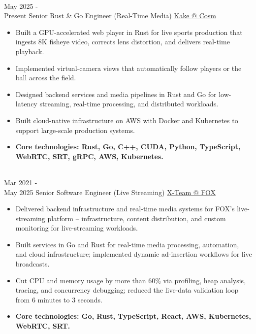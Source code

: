 \documentclass[letterpaper]{twentysecondcv} %
\begin{document}
\begin{twenty} %

\twentyitem
    {\\
    May 2025 - \\ Present}
    {Senior Rust \& Go Engineer (Real-Time Media)}
    {\href{https://kake.co/}{Kake @ Cosm}}
    {}
    {
    \begin{itemize}
    \item Built a GPU-accelerated web player in Rust for live sports production that ingests 8K fisheye video, corrects lens distortion, and delivers real-time playback.
    \item Implemented virtual-camera views that automatically follow players or the ball across the field.
    \item Designed backend services and media pipelines in Rust and Go for low-latency streaming, real-time processing, and distributed workloads.
    \item Built cloud-native infrastructure on AWS with Docker and Kubernetes to support large-scale production systems.
    \item \textbf{Core technologies: Rust, Go, C++, CUDA, Python, TypeScript, WebRTC, SRT, gRPC, AWS, Kubernetes.}
    \end{itemize}
    }

\twentyitem
    {\\
    Mar 2021 - \\ May 2025}
    {Senior Software Engineer (Live Streaming)}
    {\href{https://x-team.com/}{X-Team @ FOX}}
    {}
    {
    \begin{itemize}
    \item Delivered backend infrastructure and real-time media systems for FOX's live-streaming platform -- infrastructure, content distribution, and custom monitoring for live-streaming workloads.
    \item Built services in Go and Rust for real-time media processing, automation, and cloud infrastructure; implemented dynamic ad-insertion workflows for live broadcasts.
    \item Cut CPU and memory usage by more than 60\% via profiling, heap analysis, tracing, and concurrency debugging; reduced the live-data validation loop from 6 minutes to 3 seconds.
    \item \textbf{Core technologies: Go, Rust, TypeScript, React, AWS, Kubernetes, WebRTC, SRT.}
    \end{itemize}
    }

\end{twenty}
\pagebreak
\end{document}

